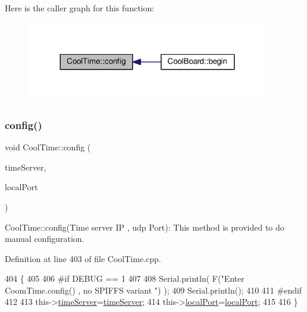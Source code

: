 Here is the caller graph for this function\+:\nopagebreak
\begin{figure}[H]
\begin{center}
\leavevmode
\includegraphics[width=299pt]{d6/d49/class_cool_time_a87c28260c1bc77091162cbcf1ee2e129_icgraph}
\end{center}
\end{figure}
\mbox{\label{class_cool_time_a014656d0d3f74d6391364b92b13e0780}} 
\subsubsection{\texorpdfstring{config()}{config()}\hspace{0.1cm}{\footnotesize\ttfamily [2/2]}}
{\footnotesize\ttfamily void Cool\+Time\+::config (\begin{DoxyParamCaption}\item[{I\+P\+Address}]{time\+Server,  }\item[{unsigned int}]{local\+Port }\end{DoxyParamCaption})}

Cool\+Time\+::config(\+Time server I\+P , udp Port)\+: This method is provided to do manual configuration. 

Definition at line 403 of file Cool\+Time.\+cpp.


\begin{DoxyCode}
404 \{
405 
406 \textcolor{preprocessor}{#if DEBUG == 1 }
407 
408     Serial.println( F(\textcolor{stringliteral}{"Enter CoomTime.config() , no SPIFFS variant "}) );
409     Serial.println();
410 
411 \textcolor{preprocessor}{#endif }
412 
413     this->\hyperlink{class_cool_time_ad2b9858f399108cb440dd1e908916f04}{timeServer}=\hyperlink{class_cool_time_ad2b9858f399108cb440dd1e908916f04}{timeServer};
414     this->\hyperlink{class_cool_time_a2f777da44d7ba678be8185299e9b49d1}{localPort}=\hyperlink{class_cool_time_a2f777da44d7ba678be8185299e9b49d1}{localPort};
415     
416 \} 
\end{DoxyCode}
\mbox{\label{class_cool_time_acd537cd4210d7bde4e1f5c47d2ac0456}} 
